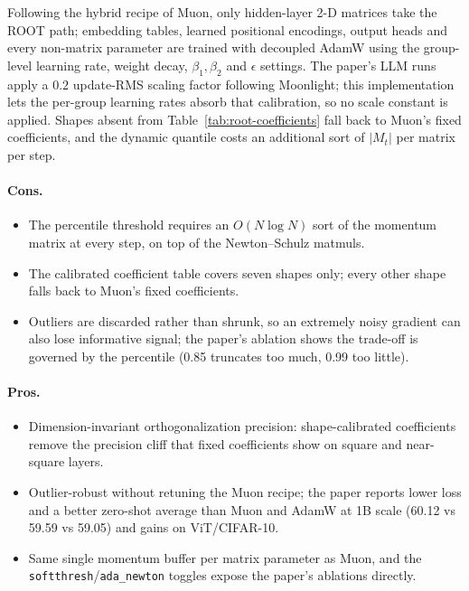 Following the hybrid recipe of Muon, only hidden-layer 2-D matrices take the ROOT path; embedding tables, learned positional encodings, output heads and every non-matrix parameter are trained with decoupled AdamW using the group-level learning rate, weight decay, $\beta_1, \beta_2$ and $\epsilon$ settings. The paper's LLM runs apply a $0.2$ update-RMS scaling factor following Moonlight; this implementation lets the per-group learning rates absorb that calibration, so no scale constant is applied. Shapes absent from Table~\ref{tab:root-coefficients} fall back to Muon's fixed coefficients, and the dynamic quantile costs an additional sort of $|M_t|$ per matrix per step.

\paragraph{Cons.}
\begin{itemize}[leftmargin=*]
\item The percentile threshold requires an $O(N\log N)$ sort of the momentum matrix at every step, on top of the Newton--Schulz matmuls.
\item The calibrated coefficient table covers seven shapes only; every other shape falls back to Muon's fixed coefficients.
\item Outliers are discarded rather than shrunk, so an extremely noisy gradient can also lose informative signal; the paper's ablation shows the trade-off is governed by the percentile (0.85 truncates too much, 0.99 too little).
\end{itemize}

\paragraph{Pros.}
\begin{itemize}[leftmargin=*]
\item Dimension-invariant orthogonalization precision: shape-calibrated coefficients remove the precision cliff that fixed coefficients show on square and near-square layers.
\item Outlier-robust without retuning the Muon recipe; the paper reports lower loss and a better zero-shot average than Muon and AdamW at 1B scale (60.12 vs 59.59 vs 59.05) and gains on ViT/CIFAR-10.
\item Same single momentum buffer per matrix parameter as Muon, and the \texttt{softthresh}/\texttt{ada\_newton} toggles expose the paper's ablations directly.
\end{itemize}

